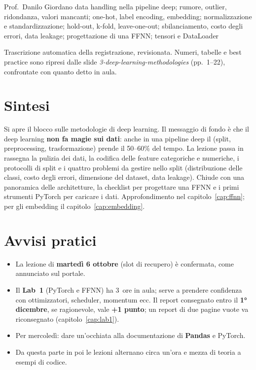   {Prof.~Danilo Giordano}
  {data handling nella pipeline deep; rumore, outlier, ridondanza, valori mancanti; one-hot, label
   encoding, embedding; normalizzazione e standardizzazione; hold-out, k-fold, leave-one-out;
   sbilanciamento, costo degli errori, data leakage; progettazione di una FFNN; tensori e DataLoader}
\label{lez:2026-10-05}

\begin{nota}[Fonte]
Trascrizione automatica della registrazione, revisionata. Numeri, tabelle e best practice sono
ripresi dalle slide \emph{3-deep-learning-methodologies} (pp.~1--22), confrontate con quanto detto
in aula.
\end{nota}

\section{Sintesi}
Si apre il blocco sulle metodologie di deep learning. Il messaggio di fondo è che il deep learning
\textbf{non fa magie sui dati}: anche in una pipeline deep il  (split,
preprocessing, trasformazione) prende il 50--60\% del tempo. La lezione passa in rassegna la pulizia
dei dati, la codifica delle feature categoriche e numeriche, i protocolli di split e i quattro
problemi da gestire nello split (distribuzione delle classi, costo degli errori, dimensione del
dataset, data leakage). Chiude con una panoramica delle architetture, la checklist per progettare
una FFNN e i primi strumenti PyTorch per caricare i dati. Approfondimento nel
capitolo~\ref{cap:ffnn}; per gli embedding il capitolo~\ref{cap:embedding}.

\section{Avvisi pratici}
\begin{itemize}
  \item La lezione di \textbf{martedì 6 ottobre} (slot di recupero) è confermata, come annunciato
    sul portale.
  \item Il \textbf{Lab~1} (PyTorch e FFNN) ha 3~ore in aula; serve a prendere confidenza con
    ottimizzatori, scheduler, momentum ecc. Il report consegnato entro il \textbf{1° dicembre}, se
    ragionevole, vale \textbf{+1 punto}; un report di due pagine vuote va riconsegnato
    (capitolo~\ref{cap:lab1}).
  \item Per mercoledì: dare un'occhiata alla documentazione di \textbf{Pandas} e PyTorch.
  \item Da questa parte in poi le lezioni alternano circa un'ora e mezza di teoria a esempi di codice.
\end{itemize}

